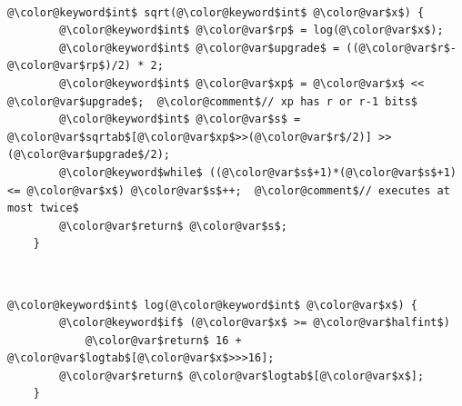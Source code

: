\documentclass[10pt]{book}
\theoremstyle{plain}
\theoremstyle{definition}
\begin{document}
 \ \vspace{.5ex}\begin{Verbatim}[gobble=1,tabsize=2,frame=single,framerule=1.2pt,commandchars=\\@\$,label=\texttt{FastSqrt},labelposition=topline]
	@\color@keyword$int$ sqrt(@\color@keyword$int$ @\color@var$x$) {
		@\color@keyword$int$ @\color@var$rp$ = log(@\color@var$x$);
		@\color@keyword$int$ @\color@var$upgrade$ = ((@\color@var$r$-@\color@var$rp$)/2) * 2;
		@\color@keyword$int$ @\color@var$xp$ = @\color@var$x$ << @\color@var$upgrade$;  @\color@comment$// xp has r or r-1 bits$
		@\color@keyword$int$ @\color@var$s$ = @\color@var$sqrtab$[@\color@var$xp$>>(@\color@var$r$/2)] >> (@\color@var$upgrade$/2);
		@\color@keyword$while$ ((@\color@var$s$+1)*(@\color@var$s$+1) <= @\color@var$x$) @\color@var$s$++;  @\color@comment$// executes at most twice$
		@\color@var$return$ @\color@var$s$;
	}
\end{Verbatim}



 \ \vspace{.5ex}\begin{Verbatim}[gobble=1,tabsize=2,frame=single,framerule=1.2pt,commandchars=\\@\$,label=\texttt{FastSqrt},labelposition=topline]
	@\color@keyword$int$ log(@\color@keyword$int$ @\color@var$x$) {
		@\color@keyword$if$ (@\color@var$x$ >= @\color@var$halfint$)
			@\color@var$return$ 16 + @\color@var$logtab$[@\color@var$x$>>>16];
		@\color@var$return$ @\color@var$logtab$[@\color@var$x$];
	}
\end{Verbatim}
\end{document}
